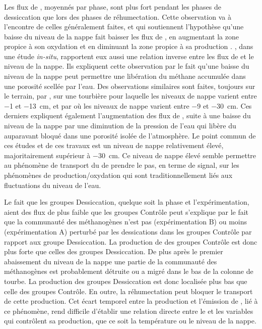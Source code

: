 \subsubsection{\chh}
Les flux de \chh, moyennés par phase, sont plus fort pendant les phases de dessiccation que lors des phases de réhumectation.
Cette observation va à l'encontre de celles généralement faites, et qui soutiennent l'hypothèse qu'une baisse du niveau de la nappe fait baisser les flux de \chh, en augmentant la zone propice à son oxydation et en diminuant la zone propice à sa production \citep{aerts1997,pelletier2007,turetsky2008}.
\citet{kettunen1996}, dans une étude \textit{in-situ}, rapportent eux aussi une relation inverse entre les flux de \chh et le niveau de la nappe.
Ils expliquent cette observation par le fait qu'une baisse du niveau de la nappe peut permettre une libération du méthane accumulée dans une porosité scellée par l'eau.
Des observations similaires sont faites, toujours sur le terrain, par \citet{bellisario1999}, sur une tourbière pour laquelle les niveaux de nappe varient entre \num{-1} et \SI{-13}{\centi\metre}, et par \citet{treat2007} où les niveaux de nappe varient entre \num{-9} et \SI{-30}{\centi\metre}.
Ces derniers expliquent également l'augmentation des flux de \chh, suite à une baisse du niveau de la nappe par une diminution de la pression de l'eau qui libère du \chh auparavant bloqué dans une porosité isolée de l'atmosphère.
Le point commun de ces études et de ces travaux est un niveau de nappe relativement élevé, majoritairement supérieur à \SI{-30}{\centi\metre}.
Ce niveau de nappe élevé semble permettre au phénomène de transport du \chh de prendre le pas, en terme de signal, sur les phénomènes de production/oxydation qui sont traditionnellement liés aux fluctuations du niveau de l'eau.

Le fait que les groupes Dessiccation, quelque soit la phase et l'expérimentation, aient des flux de \chh plus faible que les groupes Contrôle peut s'explique par le fait que la communauté des méthanogènes n'est pas (expérimentation B) ou moins (expérimentation A) perturbé par les dessications dans les groupes Contrôle par rapport aux groupe Dessiccation.
La production de \chh des groupes Contrôle est donc plus forte que celles des groupes Dessiccation.
De plus après le premier abaissement du niveau de la nappe une partie de la communauté des méthanogènes est probablement détruite ou a migré dans le bas de la colonne de tourbe.
La production des groupes Dessiccation est donc localisée plus bas que celle des groupes Contrôle.
En outre, la réhumectation peut bloquer le transport de cette production.
Cet écart temporel entre la production et l'émission de \chh, lié à ce phénomène, rend difficile d'établir une relation directe entre le \chh et les variables qui contrôlent sa production, que ce soit la température ou le niveau de la nappe.

